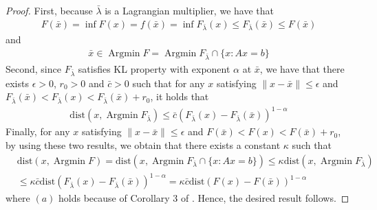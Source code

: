 \documentclass{article}
\numberwithin{equation}{section}
\def\Argmin{\mathop{\mathrm{Argmin}}}
\begin{document}
\begin{proof}
    First, because $\bar{\lambda}$ is a Lagrangian multiplier, we have that
    \begin{align}
        F(\bar{x}) =\inf F(x) = f(\bar{x}) = \inf F_{\bar{\lambda}}(x) \leq F_{\bar{\lambda}}(\bar{x}) 
        \leq F(\bar{x})   \nonumber
    \end{align}
    and 
    \begin{align}
        \bar{x} \in \Argmin F =\Argmin F_{\bar{\lambda}} \cap \{x: Ax=b\}   \nonumber
    \end{align}
    Second, since $F_{\bar{\lambda}}$ satisfies KL property with exponent $\alpha$ at $\bar{x}$, we have that there 
    exists $\epsilon>0$,  $r_0>0$ and $\bar{c}>0$ such that for any $x$ satisfying $\|x - \bar{x}\rVert \leq \epsilon$ and 
    $F_{\bar{\lambda}}(\bar{x})<F_{\bar{\lambda}}(x)< F_{\bar{\lambda}}(\bar{x})+ r_0$, it holds that 
    \begin{align}
        \mathrm{dist}(x,\Argmin F_{\bar{\lambda}}) \leq \bar{c}(F_{\bar{\lambda}}(x) - F_{\bar{\lambda}}(\bar{x}))^{1-\alpha} \nonumber
    \end{align}
    Finally, for any $x$ satisfying $\|x - \bar{x}\rVert \leq \epsilon$ and 
    $F(\bar{x})<F(x)< F(\bar{x})+ r_0$,  by using these two results, we obtain that there exists a constant $\kappa$ such that 
    \begin{align}
        &\mathrm{dist} (x, \Argmin F)  = \mathrm{dist} \left(x,\Argmin F_{\bar{\lambda}} \cap \{x: Ax=b\}\right) 
        \overset{\mathop{(a)}}{\leq} \kappa \mathrm{dist}(x, \Argmin F_{\bar{\lambda}}) \nonumber \\
        & \leq \kappa \bar{c} \mathrm{dist}(F_{\bar{\lambda}}(x) - F_{\bar{\lambda}}(\bar{x}))^{1-\alpha} = 
        \kappa \bar{c} \mathrm{dist}(F(x) - F(\bar{x}))^{1-\alpha}
    \end{align}
    where $(a)$ holds because of Corollary 3 of \cite{bauschke1999strong}.
    Hence, the desired result follows. 
\end{proof}
\end{document}
